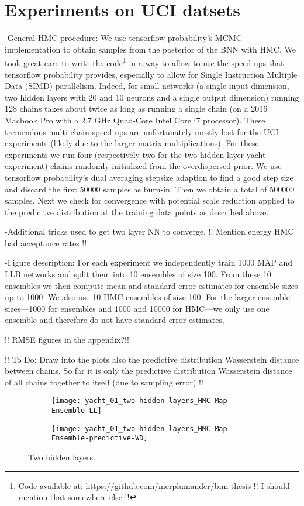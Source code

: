 \documentclass[../thesis.tex]{subfiles}
\begin{document}
\section{Experiments on UCI datsets}
-General HMC procedure:  We use tensorflow probability's MCMC implementation \parencite{lao2020tfp} to obtain samples from the posterior of the BNN with HMC. We took great care to write the code\footnote{Code available at: https://github.com/merplumander/bnn-thesis !! I should mention that somewhere else !!} in a way to allow to use the speed-ups that tensorflow probability provides, especially to allow for Single Instruction Multiple Data (SIMD) parallelism. Indeed, for small networks (a single input dimension, two  hidden layers with 20 and 10 neurons and a single output dimension) running 128 chains takes about twice as long as running a single chain (on a 2016 Macbook Pro with a 2,7 GHz Quad-Core Intel Core i7 processor). These tremendous multi-chain speed-ups are unfortunately mostly lost for the UCI experiments (likely due to the larger matrix multiplications). For these experiments we run four (respectively two for the two-hidden-layer yacht experiment) chains randomly initialized from the overdispersed prior. We use tensorflow probability's dual averaging stepsize adaption \parencite{hoffman2014no} to find a good step size and discard the first 50000 samples as burn-in. Then we obtain a total of 500000 samples. Next we check for convergence with potential scale reduction \parencite{gelman1992inference} applied to the predicitve distribution at the training data points as described above.
\bigskip 

-Additional tricks used to get two layer NN to converge. !! Mention energy HMC bad acceptance rates !!
\bigskip

-Figure description: For each experiment we independently train 1000 MAP and LLB networks and split them into 10 ensembles of size 100. From these 10 ensembles we then compute mean and standard error estimates for ensemble sizes up to 1000. We also use 10 HMC ensembles of size 100. For the larger ensemble sizes---1000 for ensembles and 1000 and 10000 for HMC---we only use one ensemble and therefore do not have standard error estimates.
\bigskip

!! RMSE figures in the appendix?!!
\bigskip

!! To Do: Draw into the plots also the predictive distribution Wasserstein distance between chains. So far it is only the predictive distribution Wasserstein distance of all chains together to itself (due to sampling error) !!
\begin{figure}
    \centering
    \begin{subfigure}{0.49\textwidth}
        \texttt{[image: yacht\_01\_two-hidden-layers\_HMC-Map-Ensemble-LL]} 
    \end{subfigure}
    \begin{subfigure}{0.49\textwidth}
        \texttt{[image: yacht\_01\_two-hidden-layers\_HMC-Map-Ensemble-predictive-WD]} 
    \end{subfigure}
    \caption{Two hidden layers.}
    \label{fig:yacht_hmc_comparison_two-hidden-layers_nll}
\end{figure}
\end{document}
